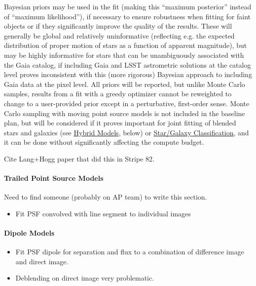 Bayesian priors may be used in the fit (making this ``maximum posterior'' instead of ``maximum likelihood''), if necessary to ensure robustness when fitting for faint objects or if they significantly improve the quality of the results.   These will generally be global and relatively uninformative (reflecting e.g. the expected distribution of proper motion of stars as a function of apparent magnitude), but may be highly informative for stars that can be unambiguously associated with the Gaia catalog, if including Gaia and LSST astrometric solutions at the catalog level proves inconsistent with this (more rigorous) Bayesian approach to including Gaia data at the pixel level.  All priors will be reported, but unlike Monte Carlo samples, results from a fit with a greedy optimizer cannot be reweighted to change to a user-provided prior except in a perturbative, first-order sense.  Monte Carlo sampling with moving point source models is not included in the baseline plan, but will be considered if it proves important for joint fitting of blended stars and galaxies (see \hyperref[sec:acHybridModels]{Hybrid Models}, below) or \hyperref[sec:acObjectClassification]{Star/Galaxy Classification}, and it can be done without significantly affecting the compute budget.

\begin{note}[TODO]
Cite Lang+Hogg paper that did this in Stripe 82.
\end{note}

\paragraph{Trailed Point Source Models}
\label{sec:acTrailedPointSourceModels}

\begin{note}
Need to find someone (probably on AP team) to write this section.
\end{note}

\begin{itemize}
\item Fit PSF convolved with line segment to individual images
\end{itemize}

\paragraph{Dipole Models}
\label{sec:acDipoleModels}
\begin{itemize}
\item Fit PSF dipole for separation and flux to a combination of difference image and direct image.
\item Deblending on direct image very problematic.
\end{itemize}

